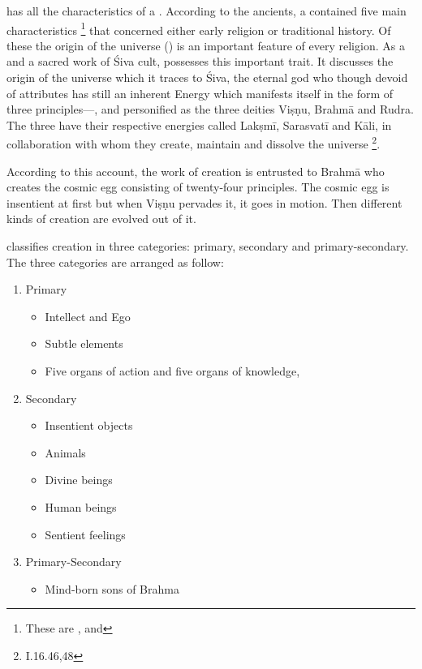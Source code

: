  has all the characteristics of a . According to
the ancients, a  contained five main characteristics
\footnote{These are , and
} that concerned either early religion or traditional history.
Of these the origin of the universe () is an important feature of
every religion. As a  and a sacred work of Śiva cult,
 possesses this important trait. It discusses the origin of
the universe which it traces to Śiva, the eternal god who though devoid of
attributes has still an inherent Energy which manifests itself in the form of
three principles—,  and  personified as the
three deities Viṣṇu, Brahmā and Rudra. The three have their respective energies
called Lakṣmī, Sarasvatī and Kāli, in collaboration with whom they create,
maintain and dissolve the universe \footnote{ I.16.46,48}.

According to this account, the work of creation is entrusted to Brahmā who
creates the cosmic egg consisting of twenty-four principles. The cosmic egg is
insentient at first but when Viṣṇu pervades it, it goes in motion. Then
different kinds of creation are evolved out of it.

 classifies creation in three categories: primary, secondary and
primary-secondary. The three categories are arranged as follow:

\begin{enumerate}
  \item Primary
  \begin{itemize}
    \item Intellect and Ego
    \item Subtle elements
    \item Five organs of action and five organs of knowledge, 
  \end{itemize}
  \item Secondary
  \begin{itemize}
    \item Insentient objects
    \item Animals
    \item Divine beings
    \item Human beings
    \item Sentient feelings
  \end{itemize}
  \item Primary-Secondary
  \begin{itemize}
    \item Mind-born sons of Brahma
  \end{itemize}
\end{enumerate}

